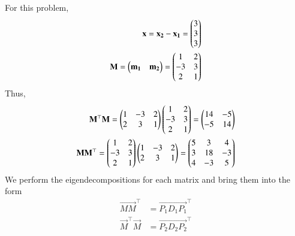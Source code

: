     For this problem,
    \begin{align}
        \mathbf{x} = \mathbf{x_2} - \mathbf{x_1} = \begin{pmatrix}3\\3\\3\end{pmatrix} \\
        \mathbf{M} = \begin{pmatrix}\mathbf{m_1} & \mathbf{m_2}\end{pmatrix} = \begin{pmatrix}1&2\\-3&3\\2&1\end{pmatrix} 
    \end{align}
    Thus,
    \begin{align}
        \mathbf{M}^\top\mathbf{M} = \begin{pmatrix}1&-3&2\\2&3&1\end{pmatrix}\begin{pmatrix}1&2\\-3&3\\2&1\end{pmatrix} = \begin{pmatrix}14&-5\\-5&14\end{pmatrix} \\
        \mathbf{MM}^\top = \begin{pmatrix}1&2\\-3&3\\2&1\end{pmatrix}\begin{pmatrix}1&-3&2\\2&3&1\end{pmatrix} = \begin{pmatrix}5&3&4\\3&18&-3\\4&-3&5\end{pmatrix}
    \end{align}
    We perform the eigendecompositions for each matrix and bring them into the form
    \begin{align}
        \vec{MM}^\top &= \vec{P_1D_1P_1}^\top \label{eq:chapters/12/11/2/16/svd/decomp-1} \\
        \vec{M}^\top\vec{M} &= \vec{P_2D_2P_2}^\top \label{eq:chapters/12/11/2/16/svd/decomp-2}
    \end{align}
